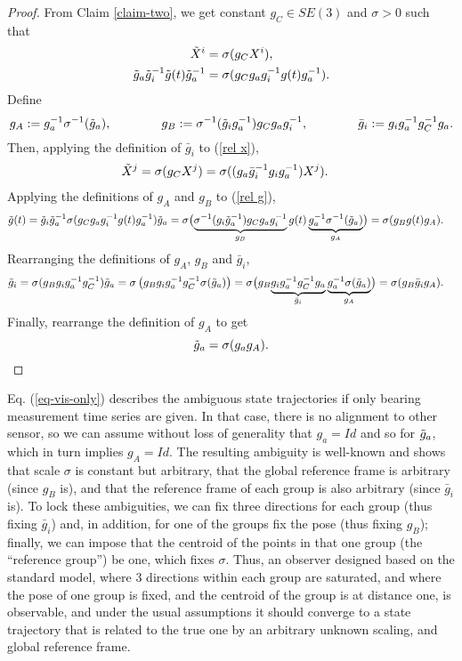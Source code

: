 \begin{proof}
From Claim \ref{claim-two}, we get constant $g_C\in SE(3)$ and $\sigma>0$ such that 
\begin{gather}
\tilde{X}^i=\sigma(g_CX^i), \label{rel x}\\
\tilde{g}_a \tilde{g}_i^{-1} \tilde{g}(t)\tilde{g}_a^{-1} = \sigma(g_Cg_ag^{-1}_ig(t)g_a^{-1}). \label{rel g}
\end{gather}
Define
$$
g_A := g_a^{-1}\sigma^{-1}(\tilde{g}_a),
\qquad\qquad
g_B :=\sigma^{-1}(\tilde{g}_ig_a^{-1})g_Cg_ag_i^{-1},
\qquad\qquad
\bar g_i := g_ig_a^{-1} g_C^{-1} g_a. 
$$
Then, applying the definition of $\bar g_i$ to (\ref{rel x}),
\begin{align*}
\tilde{X}^j &= \sigma(g_C X^j)
= \sigma((g_a\bar g_i^{-1} g_i g_a^{-1}) X^j).
\end{align*}
Applying the definitions of $g_A$ and $g_B$ to (\ref{rel g}),
\begin{align*}
\tilde{g}(t) &= \tilde{g}_i\tilde{g}_a^{-1}\sigma(g_Cg_ag_i^{-1} g(t)g_a^{-1})\tilde{g}_a
= \sigma\bigl(
\underset{g_B}{\underbrace{\sigma^{-1}(g_i \tilde{g}_a^{-1}) g_C g_a g_i^{-1}}}\,
g(t)\,
\underset{g_A}{\underbrace{g_a^{-1} \sigma^{-1}(\tilde{g}_a)}}
\bigr)
= \sigma(g_B g(t) g_A).
\end{align*}
Rearranging the definitions of $g_A$, $g_B$ and $\bar g_i$,
\begin{align*}
\tilde{g}_i &= \sigma(g_B g_i g_a^{-1} g_C^{-1})\tilde{g}_a
=\sigma\left(g_B g_i g_a^{-1} g_C^{-1} \sigma(\tilde{g}_a)\right)
=\sigma\bigl(g_B 
\underset{\bar g_i}{\underbrace{g_i g_a^{-1} g_C^{-1} g_a}}\,
\underset{g_A}{\underbrace{g_a^{-1} \sigma(\tilde{g}_a)}}
\bigr)
=\sigma(g_B\bar g_i g_A).
\end{align*}
Finally, rearrange the definition of $g_A$ to get
$$\tilde{g}_a = \sigma(g_ag_A).$$

\end{proof}
Eq. (\ref{eq-vis-only}) describes the ambiguous state trajectories if only bearing measurement time series are given. In that case, there is no alignment to other sensor, so we can assume without loss of generality that $g_a = Id$ and so for $\tilde{g}_a$, which in turn implies $g_A = Id$. The resulting ambiguity is well-known \cite{soatto97} and shows that scale $\sigma$ is constant but arbitrary, that the global reference frame is arbitrary (since $g_B$ is), and that the reference frame of each group is also arbitrary (since $\bar g_i$ is). To lock these ambiguities, we can fix three directions for each group (thus fixing $\bar g_i$) and, in addition, for one of the groups fix the pose (thus fixing $g_B$); finally, we can impose that the centroid of the points in that one group (the ``reference group'') be one, which fixes $\sigma$. Thus, an observer designed based on the standard model, where $3$ directions within each group are saturated, and where the pose of one group is fixed, and the centroid of 
the 
group is at distance one, is observable, and under the usual assumptions it should converge to a state trajectory that is related to the true one by an arbitrary unknown scaling, and global reference frame.

